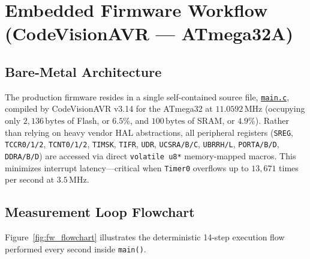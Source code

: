 \documentclass[11pt,a4paper]{article}
\newcommand{\githubrepo}{https://github.com/m7mdelsayegh/frequency_meter}
\newcommand{\ghblob}[2]{\href{\githubrepo/blob/main/#1}{\texttt{#2}}}
\begin{document}
\section{Embedded Firmware Workflow (CodeVisionAVR --- ATmega32A)}

\subsection{Bare-Metal Architecture}
The production firmware resides in a single self-contained source file, \ghblob{2_CodeVisionAVR_Firmware/main.c}{main.c}, compiled by CodeVisionAVR v3.14 for the ATmega32 at $11.0592\,\text{MHz}$ (occupying only $2{,}136\,\text{bytes}$ of Flash, or $6.5\%$, and $100\,\text{bytes}$ of SRAM, or $4.9\%$). Rather than relying on heavy vendor HAL abstractions, all peripheral registers (\texttt{SREG}, \texttt{TCCR0/1/2}, \texttt{TCNT0/1/2}, \texttt{TIMSK}, \texttt{TIFR}, \texttt{UDR}, \texttt{UCSRA/B/C}, \texttt{UBRRH/L}, \texttt{PORTA/B/D}, \texttt{DDRA/B/D}) are accessed via direct \texttt{volatile u8*} memory-mapped macros. This minimizes interrupt latency---critical when \texttt{Timer0} overflows up to $13{,}671$ times per second at $3.5\,\text{MHz}$.

\subsection{Measurement Loop Flowchart}
Figure~\ref{fig:fw_flowchart} illustrates the deterministic 14-step execution flow performed every second inside \texttt{main()}.
\end{document}

